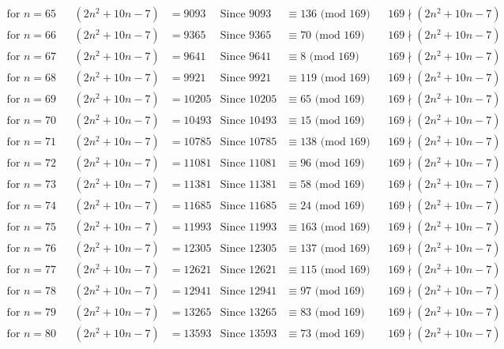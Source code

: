 \documentclass[12pt]{article}
\begin{document}
\begin{align*}
\text{for $n = 65 $}&& (2n^2+10n-7) &= 9093 & \text{Since } 9093  &\equiv  136 \text{ (mod $169$)}&& 169 \nmid (2n^2+10n-7)\\
\text{for $n = 66 $}&& (2n^2+10n-7) &= 9365 & \text{Since } 9365  &\equiv  70 \text{ (mod $169$)}&& 169 \nmid (2n^2+10n-7)\\
\text{for $n = 67 $}&& (2n^2+10n-7) &= 9641 & \text{Since } 9641  &\equiv  8 \text{ (mod $169$)}&& 169 \nmid (2n^2+10n-7)\\
\text{for $n = 68 $}&& (2n^2+10n-7) &= 9921 & \text{Since } 9921  &\equiv  119 \text{ (mod $169$)}&& 169 \nmid (2n^2+10n-7)\\
\text{for $n = 69 $}&& (2n^2+10n-7) &= 10205 & \text{Since } 10205  &\equiv  65 \text{ (mod $169$)}&& 169 \nmid (2n^2+10n-7)\\
\text{for $n = 70 $}&& (2n^2+10n-7) &= 10493 & \text{Since } 10493  &\equiv  15 \text{ (mod $169$)}&& 169 \nmid (2n^2+10n-7)\\
\text{for $n = 71 $}&& (2n^2+10n-7) &= 10785 & \text{Since } 10785  &\equiv  138 \text{ (mod $169$)}&& 169 \nmid (2n^2+10n-7)\\
\text{for $n = 72 $}&& (2n^2+10n-7) &= 11081 & \text{Since } 11081  &\equiv  96 \text{ (mod $169$)}&& 169 \nmid (2n^2+10n-7)\\
\text{for $n = 73 $}&& (2n^2+10n-7) &= 11381 & \text{Since } 11381  &\equiv  58 \text{ (mod $169$)}&& 169 \nmid (2n^2+10n-7)\\
\text{for $n = 74 $}&& (2n^2+10n-7) &= 11685 & \text{Since } 11685  &\equiv  24 \text{ (mod $169$)}&& 169 \nmid (2n^2+10n-7)\\
\text{for $n = 75 $}&& (2n^2+10n-7) &= 11993 & \text{Since } 11993  &\equiv  163 \text{ (mod $169$)}&& 169 \nmid (2n^2+10n-7)\\
\text{for $n = 76 $}&& (2n^2+10n-7) &= 12305 & \text{Since } 12305  &\equiv  137 \text{ (mod $169$)}&& 169 \nmid (2n^2+10n-7)\\
\text{for $n = 77 $}&& (2n^2+10n-7) &= 12621 & \text{Since } 12621  &\equiv  115 \text{ (mod $169$)}&& 169 \nmid (2n^2+10n-7)\\
\text{for $n = 78 $}&& (2n^2+10n-7) &= 12941 & \text{Since } 12941  &\equiv  97 \text{ (mod $169$)}&& 169 \nmid (2n^2+10n-7)\\
\text{for $n = 79 $}&& (2n^2+10n-7) &= 13265 & \text{Since } 13265  &\equiv  83 \text{ (mod $169$)}&& 169 \nmid (2n^2+10n-7)\\
\text{for $n = 80 $}&& (2n^2+10n-7) &= 13593 & \text{Since } 13593  &\equiv  73 \text{ (mod $169$)}&& 169 \nmid (2n^2+10n-7)\\

\end{align*}
\end{document}
